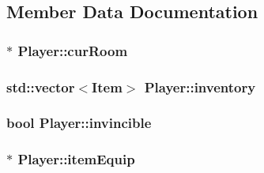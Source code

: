 \subsection{Member Data Documentation}
\subsubsection[{\texorpdfstring{cur\+Room}{curRoom}}]{$\ast$ Player\+::cur\+Room\hspace{0.3cm}{\ttfamily [private]}}\hypertarget{class_player_a3be13f6a24a17bd2d199c208a7e96611}{}\label{class_player_a3be13f6a24a17bd2d199c208a7e96611}
\subsubsection[{\texorpdfstring{inventory}{inventory}}]{\setlength{\rightskip}{0pt plus 5cm}std\+::vector$<${\bf Item}$>$ Player\+::inventory\hspace{0.3cm}{\ttfamily [private]}}\hypertarget{class_player_ad005856eb5f23892ae9687e601f12f6c}{}\label{class_player_ad005856eb5f23892ae9687e601f12f6c}
\subsubsection[{\texorpdfstring{invincible}{invincible}}]{\setlength{\rightskip}{0pt plus 5cm}bool Player\+::invincible\hspace{0.3cm}{\ttfamily [private]}}\hypertarget{class_player_aaf8419f2a11f79492d1e9081b8913374}{}\label{class_player_aaf8419f2a11f79492d1e9081b8913374}
\subsubsection[{\texorpdfstring{item\+Equip}{itemEquip}}]{$\ast$ Player\+::item\+Equip\hspace{0.3cm}{\ttfamily [private]}}\hypertarget{class_player_ae0c757e73e05e1a7ebf6f2f511db7494}{}\label{class_player_ae0c757e73e05e1a7ebf6f2f511db7494}
